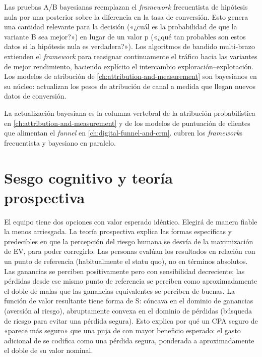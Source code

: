 Las pruebas A/B bayesianas reemplazan el \emph{framework} frecuentista de hipótesis nula por una
posterior sobre la diferencia en la tasa de conversión. Esto genera una cantidad relevante para la
decisión («¿cuál es la probabilidad de que la variante B sea mejor?») en lugar de un valor p («¿qué
tan probables son estos datos si la hipótesis nula es verdadera?»). Los algoritmos de bandido
multi-brazo extienden el \emph{framework} para reasignar continuamente el tráfico hacia las variantes
de mejor rendimiento, haciendo explícito el intercambio exploración--explotación. Los modelos de
atribución de \cref{ch:attribution-and-measurement} son bayesianos en su núcleo: actualizan los
pesos de atribución de canal a medida que llegan nuevos datos de conversión.

La actualización bayesiana es la columna vertebral de la atribución probabilística en
\cref{ch:attribution-and-measurement} y de los modelos de puntuación de clientes que alimentan el
\emph{funnel} en \cref{ch:digital-funnel-and-crm}. \textcite{anderson2019statistics} cubren los
\emph{framework}s frecuentista y bayesiano en paralelo.

\section{Sesgo cognitivo y teoría prospectiva}\label{sec:prospect-theory}

El equipo tiene dos opciones con valor esperado idéntico. Elegirá de manera fiable la menos
arriesgada. La teoría prospectiva explica las formas específicas y predecibles en que la percepción
del riesgo humana se desvía de la maximización de EV, para poder corregirlo. Las personas evalúan
los resultados en relación con un punto de referencia (habitualmente el statu quo), no en términos
absolutos. Las ganancias se perciben positivamente pero con sensibilidad decreciente; las pérdidas
desde ese mismo punto de referencia se perciben como aproximadamente el doble de malas que las
ganancias equivalentes se perciben de buenas. La función de valor resultante tiene forma de S:
cóncava en el dominio de ganancias (aversión al riesgo), abruptamente convexa en el dominio de
pérdidas (búsqueda de riesgo para evitar una pérdida segura). Esto explica por qué un CPA seguro de
 «parece más seguro» que una puja de  con mayor beneficio esperado: el gasto
adicional de  se codifica como una pérdida segura, ponderada a aproximadamente el doble
de su valor nominal.


